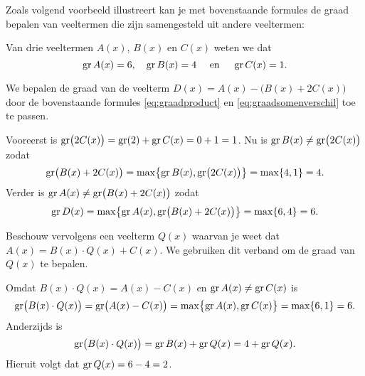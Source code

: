 \documentclass{ximera}
\begin{document}
Zoals volgend voorbeeld illustreert kan je met bovenstaande formules de graad bepalen van veeltermen die zijn samengesteld uit andere veeltermen: 
\begin{example} 

\begin{question}

Van drie veeltermen \(A(x)\), \(B(x)\) en \(C(x)\) weten we dat
\[
\operatorname{gr} A(x) = 6, \quad \operatorname{gr} B(x) = 4 \quad \text{ en } \quad \operatorname{gr} C(x) = 1.
\]

We bepalen de graad van de veelterm \(D(x) = A(x) - \bigl(B(x) + 2C(x)\bigr)\) door de bovenstaande formules \eqref{eq:graadproduct} en \eqref{eq:graadsomenverschil} toe te passen. 

Vooreerst is \(\operatorname{gr}\bigl(2C(x)\bigr) = \operatorname{gr}(2) + \operatorname{gr} C(x) = 0 + 1 = 1\). Nu is \(\operatorname{gr} B(x) \neq \operatorname{gr}\bigl(2C(x)\bigr)\) zodat
\[
\operatorname{gr} \bigl(B(x) + 2C(x)\bigr) = \max \bigl\{\operatorname{gr} B(x),\operatorname{gr}\bigl(2C(x)\bigr)\bigr\} = \max\{4,1\} = 4.
\]
Verder is \(\operatorname{gr} A(x) \neq \operatorname{gr}\bigl(B(x) + 2C(x)\bigr)\) zodat 
\[
\operatorname{gr} D(x) = \max \bigl\{\operatorname{gr} A(x),\operatorname{gr}\bigl(B(x) + 2C(x)\bigr)\bigr\} = \max\{6,4\} = 6.
\]

\end{question}	

\begin{question}


Beschouw vervolgens een veelterm \(Q(x)\) waarvan je weet dat \(A(x) = B(x)\cdot Q(x) + C(x)\). We gebruiken dit verband om de graad van \(Q(x)\) te bepalen. 

Omdat \(B(x)\cdot Q(x) = A(x) - C(x)\) en \(\operatorname{gr} A(x) \neq \operatorname{gr} C(x)\) is
\[
\operatorname{gr}\bigl(B(x)\cdot Q(x)\bigr) = \operatorname{gr}\bigl(A(x) - C(x)\bigr) = \max \bigl\{\operatorname{gr} A(x),\operatorname{gr} C(x)\bigr\} = \max\{6,1\} = 6.
\]
Anderzijds is 
\[
\operatorname{gr}\bigl(B(x)\cdot Q(x)\bigr) = \operatorname{gr} B(x) + \operatorname{gr} Q(x) = 4 + \operatorname{gr} Q(x).
\]
Hieruit volgt dat \(\operatorname{gr} Q(x) = 6-4 = 2\). 

\end{question}

\end{example} 
\end{document}
